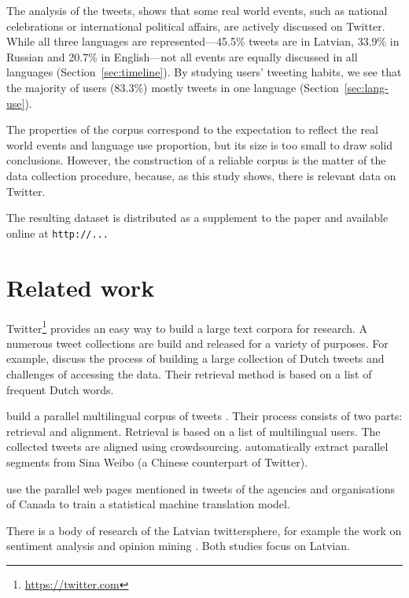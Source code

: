 \documentclass[11pt,a4paper]{article}
\begin{document}
The analysis of the tweets, shows that some real world events, such as national celebrations or international political affairs, are actively discussed on Twitter. While all three languages are represented---45.5\% tweets are in Latvian, 33.9\% in Russian and 20.7\% in English---not all events are equally discussed in all languages (Section~\ref{sec:timeline}). By studying users' tweeting habits, we see that the majority of users (83.3\%) mostly tweets in one language (Section~\ref{sec:lang-use}).

The properties of the corpus correspond to the expectation to reflect the real world events and language use proportion, but its size is too small to draw solid conclusions. However, the construction of a reliable corpus is the matter of the data collection procedure, because, as this study shows, there is relevant data on Twitter.

The resulting dataset is distributed as a supplement to the paper and available online at \texttt{http://...}

\section{Related work}

Twitter\footnote{\url{https://twitter.com}} provides an easy way to build a large text corpora for research. A numerous tweet collections are build and released for a variety of purposes. For example, \citet{sang2013} discuss the process of building a large collection of Dutch tweets and challenges of accessing the data. Their retrieval method is based on a list of frequent Dutch words.

\citet{SANVICENTE16.465} build a parallel multilingual corpus of tweets%
. Their process consists of two parts: retrieval and alignment. Retrieval is based on a list of multilingual users. The collected tweets are aligned using crowdsourcing. \citet{ling-EtAl:2013:ACL2013} automatically extract parallel segments from Sina Weibo (a Chinese counterpart of Twitter). 

\citet{gotti-langlais-farzindar:2013:LASM} use the parallel web pages mentioned in tweets of the agencies and organisations of Canada to train a statistical machine translation model.

There is a body of research of the Latvian twittersphere, for example the work on sentiment analysis \cite{Peisenieks2014} and opinion mining \cite{vspats2016opinion}. Both studies focus on Latvian.
\end{document}
